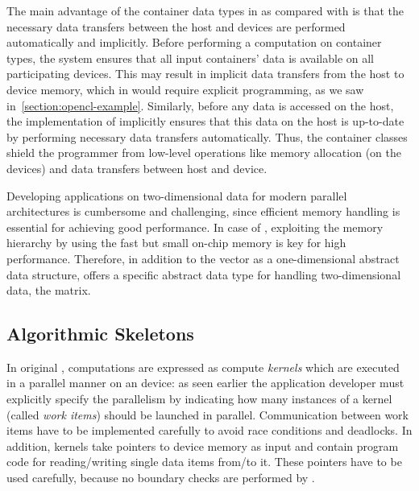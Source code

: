 The main advantage of the container data types in \SkelCL as compared with \OpenCL is that the necessary data transfers between the host and devices are performed automatically and implicitly.
Before performing a computation on container types, the \SkelCL system ensures that all input containers' data is available on all participating devices.
This may result in implicit data transfers from the host to device memory, which in \OpenCL would require explicit programming, as we saw in~\autoref{section:opencl-example}.
Similarly, before any data is accessed on the host, the implementation of \SkelCL implicitly ensures that this data on the host is up-to-date by performing necessary data transfers automatically.
Thus, the container classes shield the programmer from low-level operations like memory allocation (on the devices) and data transfers between host and device.

Developing applications on two-dimensional data for modern parallel architectures is cumbersome and challenging, since efficient memory handling is essential for achieving good performance.
In case of \GPUs, exploiting the memory hierarchy by using the fast but small on-chip memory is key for high performance.
Therefore, in addition to the vector as a one-dimensional abstract data structure, \SkelCL offers a specific abstract data type for handling two-dimensional data, the matrix.



\subsection{Algorithmic Skeletons}
\label{section:skelcl-programming-model:skeletons}
In original \OpenCL, computations are expressed as compute \emph{kernels} which are executed in a parallel manner on an \OpenCL device:
as seen earlier the application developer must explicitly specify the parallelism by indicating how many instances of a kernel (called \emph{work items}) should be launched in parallel.
Communication between work items have to be implemented carefully to avoid race conditions and deadlocks.
In addition, kernels take pointers to device memory as input and contain program code for reading/writing single data items from/to it.
These pointers have to be used carefully, because no boundary checks are performed by \OpenCL.

